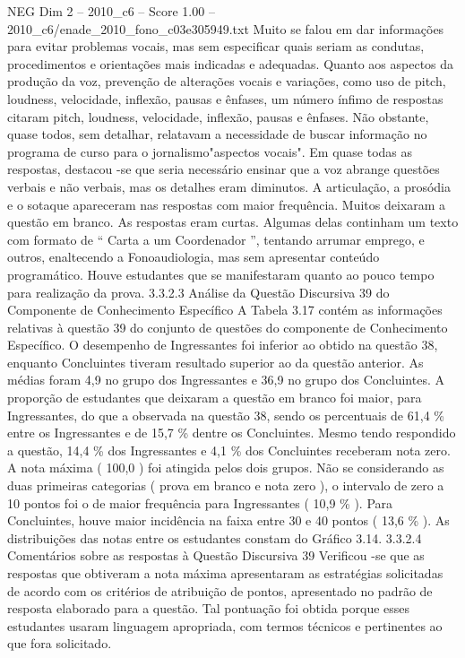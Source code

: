 \begin{textsample}{NEG Dim 2 – 2010\_c6 – Score 1.00 – 2010\_c6/enade\_2010\_fono\_c03e305949.txt}
Muito se falou em dar informações para evitar problemas vocais, mas sem especificar quais seriam as condutas, procedimentos e orientações mais indicadas e adequadas.
Quanto aos aspectos da produção da voz, prevenção de alterações vocais e variações, como uso de pitch, loudness, velocidade, inflexão, pausas e ênfases, um número ínfimo de respostas citaram pitch, loudness, velocidade, inflexão, pausas e ênfases.
Não obstante, quase todos, sem detalhar, relatavam a necessidade de buscar informação no programa de curso para o jornalismo"aspectos vocais".
Em quase todas as respostas, destacou -se que seria necessário ensinar que a voz abrange questões verbais e não verbais, mas os detalhes eram diminutos.
A articulação, a prosódia e o sotaque apareceram nas respostas com maior frequência.
Muitos deixaram a questão em branco.
As respostas eram curtas.
Algumas delas continham um texto com formato de “ Carta a um Coordenador ”, tentando arrumar emprego, e outros, enaltecendo a Fonoaudiologia, mas sem apresentar conteúdo programático.
Houve estudantes que se manifestaram quanto ao pouco tempo para realização da prova. 3.3.2.3 Análise da Questão Discursiva 39 do Componente de Conhecimento Específico A Tabela 3.17 contém as informações relativas à questão 39 do conjunto de questões do componente de Conhecimento Específico.
O desempenho de Ingressantes foi inferior ao obtido na questão 38, enquanto Concluintes tiveram resultado superior ao da questão anterior.
As médias foram 4,9 no grupo dos Ingressantes e 36,9 no grupo dos Concluintes.
A proporção de estudantes que deixaram a questão em branco foi maior, para Ingressantes, do que a observada na questão 38, sendo os percentuais de 61,4 \% entre os Ingressantes e de 15,7 \% dentre os Concluintes.
Mesmo tendo respondido a questão, 14,4 \% dos Ingressantes e 4,1 \% dos Concluintes receberam nota zero.
A nota máxima ( 100,0 ) foi atingida pelos dois grupos.
Não se considerando as duas primeiras categorias ( prova em branco e nota zero ), o intervalo de zero a 10 pontos foi o de maior frequência para Ingressantes ( 10,9 \% ).
Para Concluintes, houve maior incidência na faixa entre 30 e 40 pontos ( 13,6 \% ).
As distribuições das notas entre os estudantes constam do Gráfico 3.14. 3.3.2.4 Comentários sobre as respostas à Questão Discursiva 39 Verificou -se que as respostas que obtiveram a nota máxima apresentaram as estratégias solicitadas de acordo com os critérios de atribuição de pontos, apresentado no padrão de resposta elaborado para a questão.
Tal pontuação foi obtida porque esses estudantes usaram linguagem apropriada, com termos técnicos e pertinentes ao que fora solicitado.

\end{textsample}
